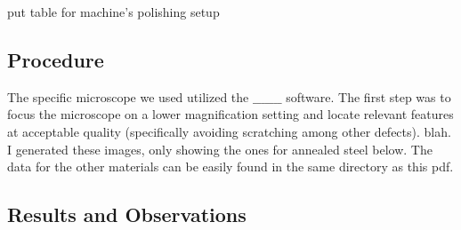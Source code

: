 \documentclass{article}
\begin{document}
put table for machine's polishing setup

\subsection{Procedure}

The specific microscope we used utilized the $\textbf{\_\_\_\_\_\_\_}$ software. The first step was to focus the microscope on a lower magnification setting and locate relevant features at acceptable quality (specifically avoiding scratching among other defects). blah. I generated these images, only showing the ones for annealed steel below. The data for the other materials can be easily found in the same directory as this pdf.

\subsection{Results and Observations}
\end{document}
